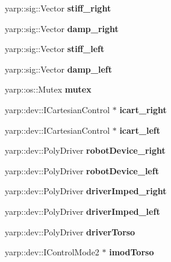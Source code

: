 \begin{DoxyCompactItemize}
\item 
yarp\+::sig\+::\+Vector {\bfseries stiff\+\_\+right}\label{classGraspExecution_a1181e7d2a8259d7bd7386e1efa004901}

\item 
yarp\+::sig\+::\+Vector {\bfseries damp\+\_\+right}\label{classGraspExecution_a9a2586409693c80b141daa30ae0e1b5b}

\item 
yarp\+::sig\+::\+Vector {\bfseries stiff\+\_\+left}\label{classGraspExecution_aadb33fbb2a639113629e6d2b49c164f4}

\item 
yarp\+::sig\+::\+Vector {\bfseries damp\+\_\+left}\label{classGraspExecution_a2a5d14ee157f71328424c9822d48b67a}

\item 
yarp\+::os\+::\+Mutex {\bfseries mutex}\label{classGraspExecution_a7d77b561dd2573fa42a28b760c030a63}

\item 
yarp\+::dev\+::\+I\+Cartesian\+Control $\ast$ {\bfseries icart\+\_\+right}\label{classGraspExecution_a39489640372dcf1928e854c20742f35e}

\item 
yarp\+::dev\+::\+I\+Cartesian\+Control $\ast$ {\bfseries icart\+\_\+left}\label{classGraspExecution_ad017fcb8fa252d6e1181bafcf2a970e5}

\item 
yarp\+::dev\+::\+Poly\+Driver {\bfseries robot\+Device\+\_\+right}\label{classGraspExecution_af1f98094e942e01dc5276ada61a8bf79}

\item 
yarp\+::dev\+::\+Poly\+Driver {\bfseries robot\+Device\+\_\+left}\label{classGraspExecution_ae92b996c91a68f9d918e395f57d5f0ef}

\item 
yarp\+::dev\+::\+Poly\+Driver {\bfseries driver\+Imped\+\_\+right}\label{classGraspExecution_aaaa42876d68ef3996cecf989dcc9e27c}

\item 
yarp\+::dev\+::\+Poly\+Driver {\bfseries driver\+Imped\+\_\+left}\label{classGraspExecution_a6696b1f3457173b856494f6ad0843f2f}

\item 
yarp\+::dev\+::\+Poly\+Driver {\bfseries driver\+Torso}\label{classGraspExecution_a0b1f4780bfcf0ef62e4063a36c43429f}

\item 
yarp\+::dev\+::\+I\+Control\+Mode2 $\ast$ {\bfseries imod\+Torso}\label{classGraspExecution_a009a185d69d7dbae7741091703c4beca}


\end{DoxyCompactItemize}

